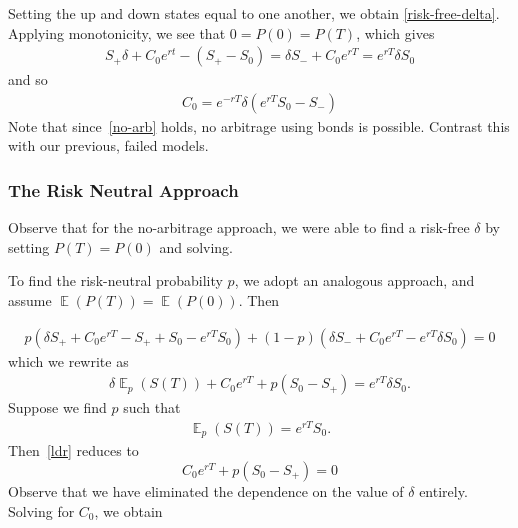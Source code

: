 \documentclass[12pt]{article}
\DeclareMathOperator{\ex}{\mathbb{E}}
\theoremstyle{plain}
\theoremstyle{definition}
\theoremstyle{remark}
\numberwithin{equation}{section}  %
\begin{document}
Setting the up and down states equal to one another, we obtain
\eqref{risk-free-delta}. Applying monotonicity, we see that
$0 = P(0) = P(T)$, which gives
\begin{equation}\label{no-arb}
	\begin{split}
		S_{+} \delta + C_{0}e^{rt} - (S_{+} - S_{0})
		= 	\delta S_{-} + C_{0} e^{rT} = e^{rT} \delta S_{0} 
	\end{split}
\end{equation}
and so
\begin{equation}
	\begin{split}
		C_{0} = e^{-rT}\delta(e^{rT} S_{0} - S_{-})
	\end{split}
\end{equation}
Note that since~\eqref{no-arb} holds, no arbitrage using bonds is
possible. Contrast this with our previous, failed models. 
\subsubsection{The Risk Neutral Approach}
Observe that for the no-arbitrage approach, we were able to find a risk-free
$\delta$ by setting $P(T) = P(0)$ and solving.

To find the risk-neutral probability $p$, we adopt an analogous approach,
and assume $\ex(P(T)) = \ex(P(0))$. Then

\begin{equation*}
	\begin{split}
		p(\delta S_{+} + C_{0} e^{rT} - S_{+} + S_{0} - e^{rT}S_{0})
		+ (1-p)(\delta S_{-} + C_{0} e^{rT} - e^{rT} \delta S_{0}) = 0
	\end{split}
\end{equation*}
which we rewrite as
\begin{equation}
	\label{ldr}
	\begin{split}
		\delta \ex_{p}(S(T)) + C_{0} e^{rT} + p(S_{0} - S_{+}) = e^{rT} \delta
		S_{0}.
	\end{split}
\end{equation}
Suppose we find $p$ such that 
\begin{equation}\label{fpp}
	\begin{split}
		\ex_{p}(S(T)) = e^{rT} S_{0}.
	\end{split}
\end{equation}
Then~\eqref{ldr} reduces to
\begin{equation*}
	C_{0} e^{rT} + p(S_{0} - S_{+}) = 0 
\end{equation*}
Observe that we have eliminated the dependence on the value of $\delta$
entirely. Solving for $C_{0}$, we obtain
\end{document}
